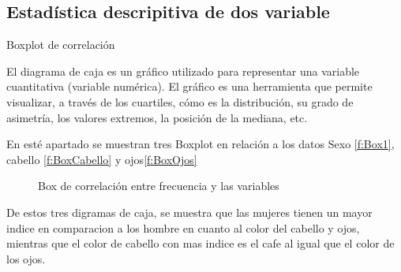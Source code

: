 \documentclass[12pt,a4paper]{article}
\begin{document}
\newpage
\subsection{Estadística descripitiva de dos variable}


Boxplot de correlación \citep{RPubs}

El diagrama de caja es un gráfico utilizado para representar una variable cuantitativa (variable numérica). El gráfico es una herramienta que permite visualizar, a través de los cuartiles, cómo es la distribución, su grado de asimetría, los valores extremos, la posición de la mediana, etc.

En esté apartado se muestran tres Boxplot en relación a los datos Sexo \ref{f:Box1}, cabello \ref{f:BoxCabello} y ojos\ref{f:BoxOjos}


\begin{figure}[h]
 \centering
 \caption{Box de correlación entre frecuencia y las variables}
 \label{f:Box}
\end{figure}

De estos tres digramas de caja, se muestra que las mujeres tienen un mayor indice en comparacion a los hombre en cuanto al color del cabello y ojos, mientras que el color de cabello con mas indice es el cafe al igual que el color de los ojos.
\newline
\newline
\end{document}
